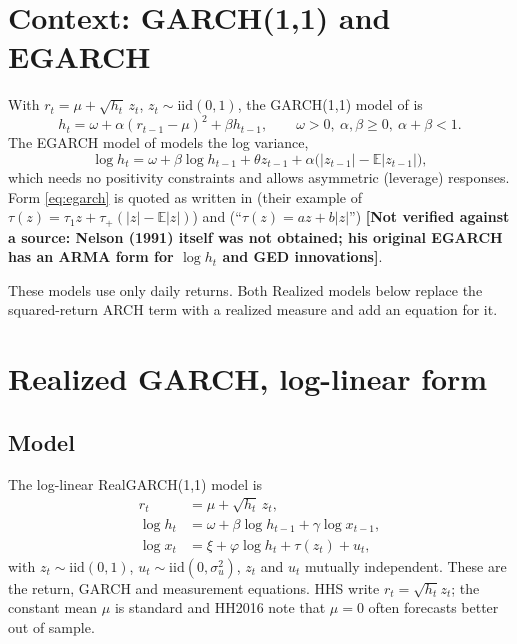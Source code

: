 \documentclass[11pt]{article}
\newcommand{\E}{\mathbb{E}}
\newcommand{\unverified}[1]{\textbf{[Not verified against a source: #1]}}
\begin{document}
\section{Context: GARCH(1,1) and EGARCH}
With $r_t=\mu+\sqrt{h_t}\,z_t$, $z_t\sim\text{iid}(0,1)$, the GARCH(1,1) model of
\cite{Bollerslev1986} is
\begin{equation}\label{eq:garch}
h_t = \omega + \alpha (r_{t-1}-\mu)^2 + \beta h_{t-1},\qquad \omega>0,\ \alpha,\beta\ge0,\ \alpha+\beta<1 .
\end{equation}
The EGARCH model of \cite{Nelson1991} models the log variance,
\begin{equation}\label{eq:egarch}
\log h_t = \omega + \beta\log h_{t-1} + \theta z_{t-1} + \alpha\bigl(|z_{t-1}|-\E|z_{t-1}|\bigr),
\end{equation}
which needs no positivity constraints and allows asymmetric (leverage) responses. Form
\eqref{eq:egarch} is quoted as written in \cite{HHS2012} (their example of
$\tau(z)=\tau_1 z+\tau_+(|z|-\E|z|)$) and \cite{HH2016} (``$\tau(z)=az+b|z|$'')
\unverified{Nelson (1991) itself was not obtained; his original EGARCH has an ARMA form for
$\log h_t$ and GED innovations}.

These models use only daily returns. Both Realized models below replace the squared-return
ARCH term with a realized measure and add an equation for it.

\section{Realized GARCH, log-linear form \cite{HHS2012}}

\subsection{Model}
The log-linear RealGARCH(1,1) model is
\begin{align}
r_t &= \mu + \sqrt{h_t}\, z_t, \label{eq:rg-ret}\\
\log h_t &= \omega + \beta \log h_{t-1} + \gamma \log x_{t-1}, \label{eq:rg-garch}\\
\log x_t &= \xi + \varphi \log h_t + \tau(z_t) + u_t, \label{eq:rg-meas}
\end{align}
with $z_t\sim\text{iid}(0,1)$, $u_t\sim\text{iid}(0,\sigma_u^2)$, $z_t$ and $u_t$ mutually
independent. These are the return, GARCH and measurement equations. HHS write
$r_t=\sqrt{h_t}z_t$; the constant mean $\mu$ is standard and HH2016 note that $\mu=0$ often
forecasts better out of sample.
\end{document}
